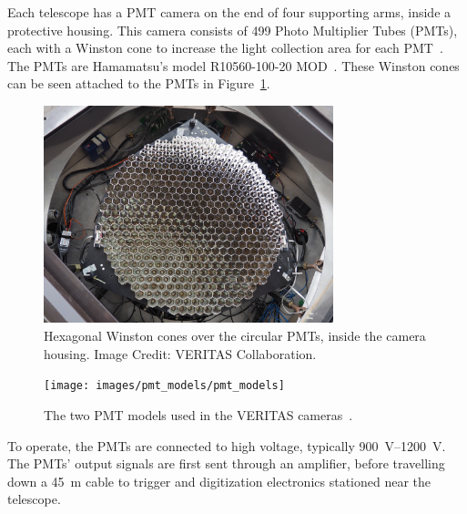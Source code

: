 Each telescope has a PMT camera on the end of four supporting arms, inside a protective housing.
This camera consists of 499 Photo Multiplier Tubes (PMTs), each with a Winston cone to increase the light collection area for each PMT~\cite{Winston1970}.
The PMTs are Hamamatsu's model R10560-100-20 MOD~\cite{pmtmodels}.
These Winston cones can be seen attached to the PMTs in Figure~\ref{fig:winstcones}.

\begin{figure}[ht]
  \centering
  \includegraphics[width=0.75\textwidth]{images/winston_cones_t2}
  \caption[Winston Cones]{
    Hexagonal Winston cones over the circular PMTs, inside the camera housing.
    Image Credit: VERITAS Collaboration.
    \CaptionBlankLine
    }
  \label{fig:winstcones}
\end{figure}


\begin{figure}[ht]
  \centering
  \texttt{[image: images/pmt\_models/pmt\_models]}
  \caption[PMT Models]{
    The two PMT models used in the VERITAS cameras~\cite{pmtmodels}.}
  \label{fig:pmtmodels}
\end{figure}

To operate, the PMTs are connected to high voltage, typically \SIrange{900}{1200}{V}.
%
%
The PMTs' output signals are first sent through an amplifier, before travelling down a \nicetilde{}\SI{45}{m} cable to trigger and digitization electronics stationed near the telescope.

